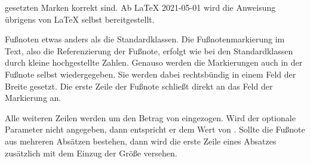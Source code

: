 gesetzten Marken korrekt sind. %
%
%
Ab %
\LaTeX{} 2021-05-01 wird die Anweisung übrigens von \LaTeX{} selbst
bereitgestellt.%
\EndIndexGroup

\begin{Declaration}
\end{Declaration}%
Fußnoten etwas anders als die Standardklassen.
Die Fußnotenmarkierung im Text, also die Referenzierung der Fußnote, erfolgt
wie bei den Standardklassen durch kleine hochgestellte Zahlen.  Genauso werden
die Markierungen auch in der Fußnote selbst wiedergegeben. Sie werden dabei
rechtsbündig in einem Feld der Breite  gesetzt. Die erste
Zeile der Fußnote schließt direkt an das Feld der Markierung an.

Alle weiteren Zeilen werden um den Betrag von 
eingezogen. Wird der optionale
Parameter  nicht angegeben, dann entspricht er dem Wert
von .  Sollte die Fußnote aus mehreren Absätzen bestehen, dann
wird die erste Zeile eines Absatzes zusätzlich mit dem Einzug der Größe
 versehen.

